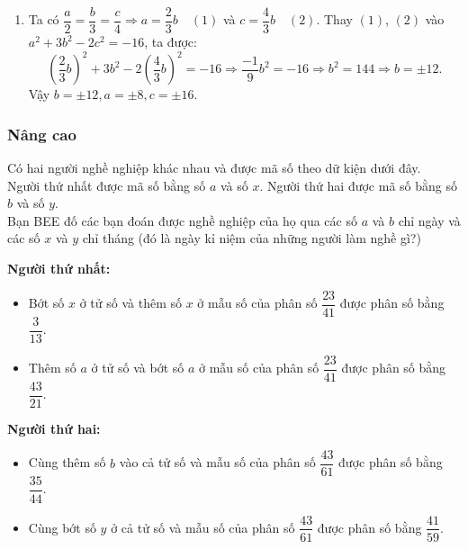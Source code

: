 \begin{bt}
{\begin{enumerate}
			$$\dfrac{2}{3} b \cdot \dfrac{5}{3} b \cdot b = -1920 \Rightarrow b^3 = -1728 \Rightarrow b = -12 \Rightarrow a = -8, c = -20.$$ 
			\item Ta có $\dfrac{a}{2} = \dfrac{b}{3} = \dfrac{c}{4} \Rightarrow a = \dfrac{2}{3} b \quad(1)$ và $c = \dfrac{4}{3} b \quad(2)$. Thay $(1)$, $(2)$ vào $a^2 + 3b^2 - 2c^2 = -16$, ta được:
			$$\left( \dfrac{2}{3} b\right)^2 + 3b^2 - 2 \left( \dfrac{4}{3} b \right)^2 = -16 \Rightarrow \dfrac{-1}{9}b^2 = -16 \Rightarrow b^2 = 144 \Rightarrow b = \pm 12.$$
			Vậy $b = \pm 12, a = \pm 8, c = \pm 16$. 
		\end{enumerate}
	}
\end{bt}
\subsubsection{Nâng cao}
\begin{bt}
	Có hai người nghề nghiệp khác nhau và được mã số theo dữ kiện dưới đây.\\
	Người thứ nhất được mã số bằng số $a$ và số $x$. Người thứ hai được mã số bằng số $b$ và số $y$.\\
	Bạn BEE đố các bạn đoán được nghề nghiệp của họ qua các số $a$ và $b$ chỉ ngày và các số $x$ và $y$ chỉ tháng (đó là ngày kỉ niệm của những người làm nghề gì?)
	
	\textbf{Người thứ nhất:}
	\begin{itemize}
		\item Bớt số $x$ ở tử số và thêm số $x$ ở mẫu số của phân số $\dfrac{23}{41}$ được phân số bằng $\dfrac{3}{13}$.
		\item Thêm số $a$ ở tử số và bớt số $a$ ở mẫu số của phân số $\dfrac{23}{41}$ được phân số bằng $\dfrac{43}{21}$.
	\end{itemize}
	\textbf{Người thứ hai:}
	
	\begin{itemize}
		\item Cùng thêm số $b$ vào cả tử số và mẫu số của phân số $\dfrac{43}{61}$ được phân số bằng $\dfrac{35}{44}$.
		\item Cùng bớt số $y$ ở cả tử số và mẫu số của phân số $\dfrac{43}{61}$ được phân số bằng $\dfrac{41}{59}$.
	\end{itemize}
\end{bt}	
